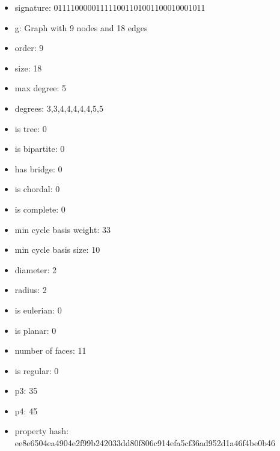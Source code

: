 \newpage
\begin{figure}
\end{figure}
\begin{itemize}
\item signature: 011110000011111001101001100010001011
\item g: Graph with 9 nodes and 18 edges
\item order: 9
\item size: 18
\item max degree: 5
\item degrees: 3,3,4,4,4,4,4,5,5
\item is tree: 0
\item is bipartite: 0
\item has bridge: 0
\item is chordal: 0
\item is complete: 0
\item min cycle basis weight: 33
\item min cycle basis size: 10
\item diameter: 2
\item radius: 2
\item is eulerian: 0
\item is planar: 0
\item number of faces: 11
\item is regular: 0
\item p3: 35
\item p4: 45
\item property hash: ee8e6504ea4904e2f99b242033dd80f806c914efa5cf36ad952d1a46f4be0b46
\end{itemize}
